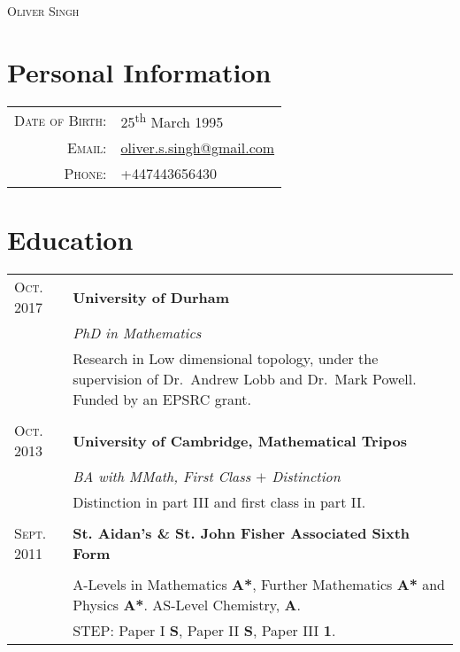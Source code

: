 \documentclass[a4paper]{article}
\makeatletter
\newcommand{\tablebreak}{\multicolumn{2}{c}{} \\}
\newlength{\datelength}
\newenvironment{datejobtable}{\begin{tabular}{@{} >{\raggedleft}p{\datelength} | p{\linewidth- \datelength - 2\tabcolsep - \arrayrulewidth} @{}}}{\end{tabular}}
\newcommand{\job}[5][]{

\textsc{#2} \ifthenelse{\equal{#3}{}}{}{to}  & \textbf{#4}\\
\ifthenelse{\equal{#3}{Present}}{Present}{\textsc{#3}}\ifthenelse{\equal{#1}{}}{}{&\textit{#1}\\}&\small #5\\
}
\makeatother
\begin{document}
\pagestyle{empty}
\bigbreak
{\center \textsc{\huge Oliver Singh}\\}

\section*{Personal Information} 
\begin{tabular}{r l}
\textsc{Date of Birth:}     & 25\textsuperscript{th} March 1995\\ 
\textsc{Email:} & \href{mailto:oliver.s.singh@gmail.com}{oliver.s.singh@gmail.com}\\
\textsc{Phone:} & {+447443656430}\\
\end{tabular}




\section*{Education}
\begin{datejobtable}

\job[PhD in Mathematics]{Oct. 2017}{Present}{University of Durham}{Research in Low dimensional topology, under the supervision of Dr.~Andrew Lobb and Dr.~Mark Powell. Funded by an EPSRC grant.}

\tablebreak

\job[BA with MMath, First Class $+$ Distinction]{Oct. 2013}{Jun. 2017}{University of Cambridge, Mathematical Tripos}{Distinction in part III and first class in part II. }

\tablebreak

\job{Sept. 2011}{Jul. 2013}{St. Aidan's \& St. John Fisher Associated Sixth Form}{A-Levels in Mathematics \textbf{A*}, Further Mathematics \textbf{A*} and Physics \textbf{A*}. \small AS-Level Chemistry, \textbf{A}. \\ &\small STEP: Paper I \textbf{S}, Paper II \textbf{S}, Paper III \textbf{1}.}

\end{datejobtable}
\end{document}
